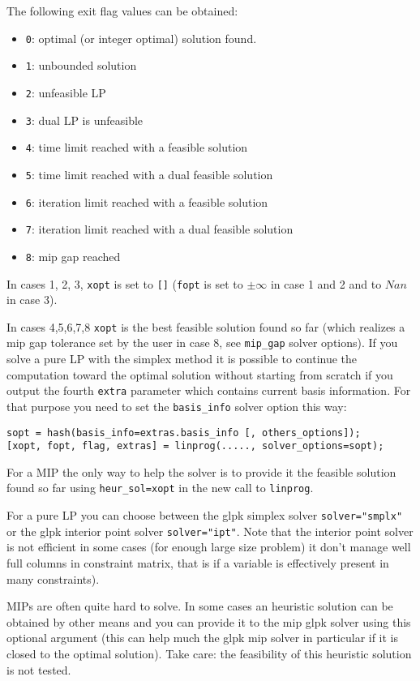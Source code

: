 \begin{mandescription}
The following exit flag values can be obtained:
\begin{itemize}
\item \verb+0+: optimal (or integer optimal) solution found.
\item \verb+1+: unbounded solution
\item \verb+2+: unfeasible LP
\item \verb+3+: dual LP is unfeasible
\item \verb+4+: time limit reached with a feasible solution
\item \verb+5+: time limit reached with a dual feasible solution
\item \verb+6+: iteration limit reached with a feasible solution
\item \verb+7+: iteration limit reached with a dual feasible solution
\item \verb+8+: mip gap reached
\end{itemize}

In cases 1, 2, 3, \verb+xopt+ is set to \verb+[]+ (\verb+fopt+ is set to
$\pm \infty$ in case 1 and 2 and to $Nan$ in case 3). 

In cases 4,5,6,7,8 \verb+xopt+ is the best feasible solution found so far 
(which realizes a mip gap tolerance set by the user in case 8, 
see \verb+mip_gap+ solver options). If you solve a pure LP with the simplex
method it is possible to continue the computation toward the optimal
solution without starting from scratch if you output the fourth \verb+extra+
parameter which contains current basis information. For that purpose you
need to set the \verb+basis_info+ solver option this way:
\begin{Verbatim}
sopt = hash(basis_info=extras.basis_info [, others_options]);
[xopt, fopt, flag, extras] = linprog(....., solver_options=sopt);
\end{Verbatim}
For a MIP the only way to help the solver is to provide it the feasible 
solution found so far using \verb+heur_sol=xopt+ in the new call to
\verb+linprog+.

For a pure LP you can choose between the glpk simplex solver 
{\tt solver="smplx"} or the glpk interior point solver 
{\tt solver="ipt"}. Note that the interior point solver is
not efficient in some cases (for enough large size problem) 
it don't manage well full columns in constraint matrix, that is if a variable
is effectively present in many constraints).

MIPs are often quite hard to solve. In some cases an heuristic solution
can be obtained by other means and you can provide it to the mip glpk
solver using this optional argument (this can help much the glpk mip 
solver in particular if it is closed to the optimal solution). 
Take care: the feasibility of this  heuristic solution is 
not tested.


\end{mandescription}
